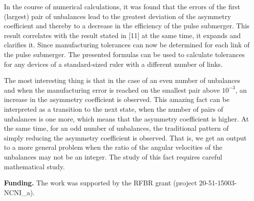 \documentclass[
11pt,%
tightenlines,%
twoside,%
onecolumn,%
nofloats,%
nobibnotes,%
nofootinbib,%
superscriptaddress,%
noshowpacs,%
centertags]%
{revtex4}
\begin{document}
In the course of numerical calculations, it was  found that the
errors of the first (largest) pair of unbalances lead to the
greatest deviation of the asymmetry coefficient and thereby to a
decrease in the efficiency of the pulse submerger. This result
correlates with the result stated in [11] at the same time, it
expands and clarifies it. Since manufacturing tolerances can now be
determined for each link of the pulse submerger. The presented
formulas can be used to calculate tolerances for any devices of a
standard-sized ruler with a different number of links.

The most interesting thing is that in the case of an  even number of
unbalances and when the manufacturing error is reached on the
smallest pair above $10^{-3}$, an increase in the asymmetry
coefficient is observed. This amazing fact can be interpreted as a
transition to the next state, when the number of pairs of unbalances
is one more, which means that the asymmetry coefficient is higher.
At the same time, for an odd number of unbalances, the traditional
pattern of simply reducing the asymmetry coefficient is observed.
That is, we get an output to a more general problem when the ratio
of the angular velocities of the unbalances may not be an integer.
The study of this fact requires careful mathematical study.



{\bf Funding.} The work was supported by the RFBR grant (project
20-51-15003-NCNI\_a).


%
%
\end{document}
